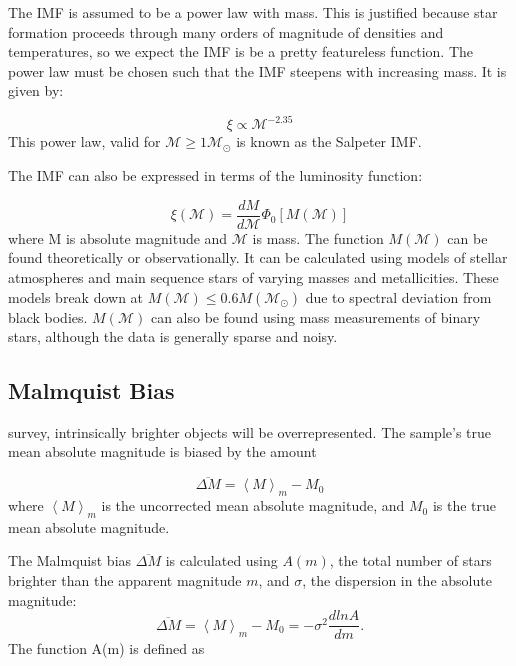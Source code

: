 The IMF is assumed to be a power law with mass. This is justified because star formation proceeds through many orders of magnitude of densities and temperatures, so we expect the IMF is be a pretty featureless function. The power law must be chosen such that the IMF steepens with increasing mass. It is given by:

\begin{equation}
\xi  \propto \mathcal{M}^{-2.35}
\end{equation}
This power law, valid for $\mathcal{M} \geq 1\mathcal{M}_\odot$ is known as the Salpeter IMF.

The IMF can also be expressed in terms of the luminosity function:

\begin{equation}
\xi(\mathcal{M}) = \frac{dM}{d\mathcal{M}} \Phi_0 [M(\mathcal{M})]
\end{equation}
where M is absolute magnitude and $\mathcal{M}$ is mass. The function $M(\mathcal{M})$ can be found theoretically or observationally. It can be calculated using models of stellar atmospheres and main sequence stars of varying masses and metallicities. These models break down at $M(\mathcal{M}) \leq 0.6 M(\mathcal{M}_\odot)$ due to spectral deviation from black bodies. $M(\mathcal{M})$ can also be found using mass measurements of binary stars, although the data is generally sparse and noisy. 

\subsection{Malmquist Bias}

 survey, intrinsically brighter objects
will be overrepresented. The sample's true mean absolute magnitude is biased by the amount

\begin{equation}
\overline{\Delta M} = \left<M\right>_m - M_0
\end{equation}
where $\left<M\right>_m $ is the uncorrected mean absolute magnitude, and $M_0$ is the true mean absolute magnitude. 

The Malmquist bias $\overline{\Delta M}$ is calculated using $A(m)$, the total number of stars brighter than the apparent magnitude $m$, and $\sigma$, the dispersion in the absolute magnitude:
\begin{equation}
\overline{\Delta M} = \left<M\right>_m - M_0 = -\sigma^2 \frac{d ln A}{dm}.
\end{equation}
The function A(m) is defined as

